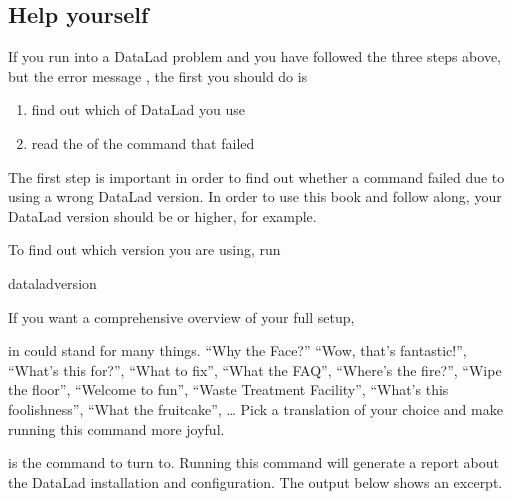 \subsection{Help yourself}
\label{\detokenize{basics/101-135-help:help-yourself}}
\sphinxAtStartPar
If you run into a DataLad problem and you have followed the three
steps above, but the error message
,
the first you should do is
\begin{enumerate}
%
\item {} 
\sphinxAtStartPar
find out which  of DataLad you use

\item {} 
\sphinxAtStartPar
read the  of the command that failed

\end{enumerate}

\sphinxAtStartPar
The first step is important in order to find out whether a
command failed due to using a wrong DataLad version. In order
to use this book and follow along, your DataLad version
should be  or higher, for example.

\sphinxAtStartPar
To find out which version you are using, run

\begin{sphinxVerbatim}[commandchars=\\\{\}]
datalad\PYGZhy{}\PYGZhy{}version
\end{sphinxVerbatim}

\ignorespaces 
\sphinxAtStartPar
If you want a comprehensive overview of your full setup,
%
\begin{footnote}\sphinxAtStartFootnote
{} in  could stand for many things. “Why the Face?”
“Wow, that’s fantastic!”, “What’s this for?”, “What to fix”, “What the FAQ”,
“Where’s the fire?”, “Wipe the floor”, “Welcome to fun”,
“Waste Treatment Facility”, “What’s this foolishness”, “What the fruitcake”, …
Pick a translation of your choice and make running this command more joyful.
%
\end{footnote} is the command to turn to. Running this command will
generate a report about the DataLad installation and configuration.
The output below shows an excerpt.

